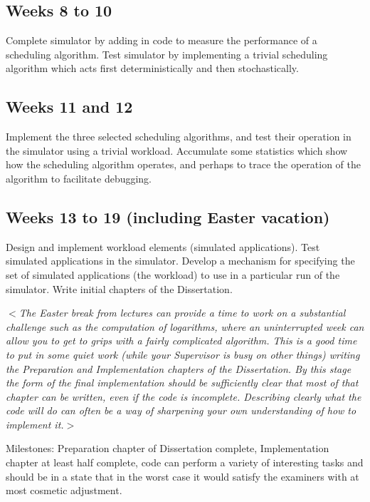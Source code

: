 \documentclass[12pt]{article}
\newcommand{\al}{$<$}
\newcommand{\ar}{$>$}
\begin{document}
\subsection*{Weeks 8 to 10}

Complete simulator by adding in code to measure the performance of a
scheduling algorithm. Test simulator by implementing a trivial
scheduling algorithm which acts first deterministically and then
stochastically.


\subsection*{Weeks 11 and 12}

Implement the three selected scheduling algorithms, and test their
operation in the simulator using a trivial workload.  Accumulate some
statistics which show how the scheduling algorithm operates, and
perhaps to trace the operation of the algorithm to facilitate
debugging.


\subsection*{Weeks 13 to 19 (including Easter vacation)}

Design and implement workload elements (simulated applications).  Test
simulated applications in the simulator.  Develop a mechanism for
specifying the set of simulated applications (the workload) to use in
a particular run of the simulator.  Write initial chapters of the
Dissertation.

\al\emph{The Easter break from lectures can provide a time to work on
  a substantial challenge such as the computation of logarithms, where
  an uninterrupted week can allow you to get to grips with a fairly
  complicated algorithm.  This is a good time to put in some quiet
  work (while your Supervisor is busy on other things) writing the
  Preparation and Implementation chapters of the Dissertation.  By
  this stage the form of the final implementation should be
  sufficiently clear that most of that chapter can be written, even if
  the code is incomplete.  Describing clearly what the code will do
  can often be a way of sharpening your own understanding of how to
  implement it.}\ar

Milestones: Preparation chapter of Dissertation complete,
Implementation chapter at least half complete, code can perform a
variety of interesting tasks and should be in a state that in the
worst case it would satisfy the examiners with at most cosmetic
adjustment.
\end{document}
